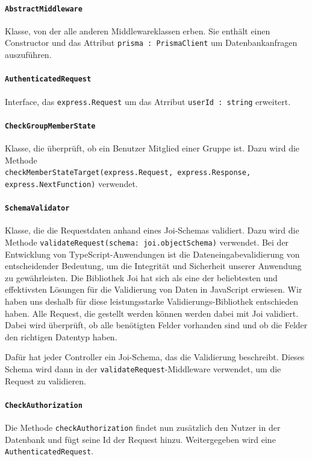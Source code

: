 \documentclass{implementierungsheft}
\begin{document}
\paragraph{\texttt{AbstractMiddleware}} Klasse, von der alle anderen Middlewareklassen erben. Sie enthält einen Constructor und das Attribut \texttt{prisma : PrismaClient} um Datenbankanfragen auszuführen.

\paragraph{\texttt{AuthenticatedRequest}} Interface, das \texttt{express.Request} um das Atrribut \texttt{userId : string} erweitert.

\paragraph{\texttt{CheckGroupMemberState}} Klasse, die überprüft, ob ein Benutzer Mitglied einer Gruppe ist. Dazu wird die Methode \\ \texttt{checkMemberStateTarget(express.Request, express.Response, express.NextFunction)} verwendet.

\paragraph{\texttt{SchemaValidator}} Klasse, die die Requestdaten anhand eines Joi-Schemas validiert. Dazu wird die Methode \texttt{validateRequest(schema: joi.objectSchema)} verwendet.
Bei der Entwicklung von TypeScript-Anwendungen ist die Dateneingabevalidierung von entscheidender Bedeutung, um die Integrität und Sicherheit unserer Anwendung zu gewährleisten. Die Bibliothek Joi hat sich als eine der beliebtesten und effektivsten Lösungen für die Validierung von Daten in JavaScript erwiesen. Wir haben uns deshalb für diese leistungsstarke Validierungs-Bibliothek entschieden haben.
Alle Request, die gestellt werden können werden dabei mit Joi validiert. Dabei wird überprüft, ob alle benötigten Felder vorhanden sind und ob die Felder den richtigen Datentyp haben.

Dafür hat jeder Controller ein Joi-Schema, das die Validierung beschreibt. Dieses Schema wird dann in der \texttt{validateRequest}-Middleware verwendet, um die Request zu validieren.

\paragraph{\texttt{CheckAuthorization}} Die Methode \texttt{checkAuthorization} findet nun zusätzlich den Nutzer in der Datenbank und fügt seine Id der Request hinzu. Weitergegeben wird eine \texttt{AuthenticatedRequest}.
\end{document}

